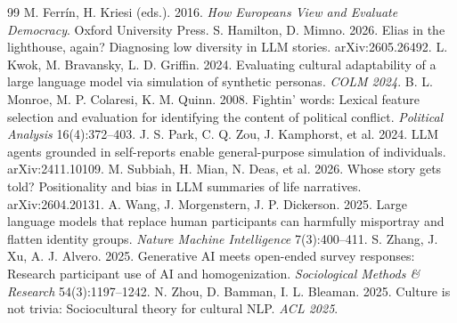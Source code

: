 \documentclass[10pt,twocolumn]{article}
\begin{document}
\begin{thebibliography}{99}
 M. Ferrín, H. Kriesi (eds.). 2016. \emph{How Europeans View and Evaluate Democracy}. Oxford University Press.
 S. Hamilton, D. Mimno. 2026. Elias in the lighthouse, again? Diagnosing low diversity in LLM stories. arXiv:2605.26492.
 L. Kwok, M. Bravansky, L. D. Griffin. 2024. Evaluating cultural adaptability of a large language model via simulation of synthetic personas. \emph{COLM 2024}.
 B. L. Monroe, M. P. Colaresi, K. M. Quinn. 2008. Fightin' words: Lexical feature selection and evaluation for identifying the content of political conflict. \emph{Political Analysis} 16(4):372--403.
 J. S. Park, C. Q. Zou, J. Kamphorst, et al. 2024. LLM agents grounded in self-reports enable general-purpose simulation of individuals. arXiv:2411.10109.
 M. Subbiah, H. Mian, N. Deas, et al. 2026. Whose story gets told? Positionality and bias in LLM summaries of life narratives. arXiv:2604.20131.
 A. Wang, J. Morgenstern, J. P. Dickerson. 2025. Large language models that replace human participants can harmfully misportray and flatten identity groups. \emph{Nature Machine Intelligence} 7(3):400--411.
 S. Zhang, J. Xu, A. J. Alvero. 2025. Generative AI meets open-ended survey responses: Research participant use of AI and homogenization. \emph{Sociological Methods \& Research} 54(3):1197--1242.
 N. Zhou, D. Bamman, I. L. Bleaman. 2025. Culture is not trivia: Sociocultural theory for cultural NLP. \emph{ACL 2025}.
\end{thebibliography}
\end{document}

